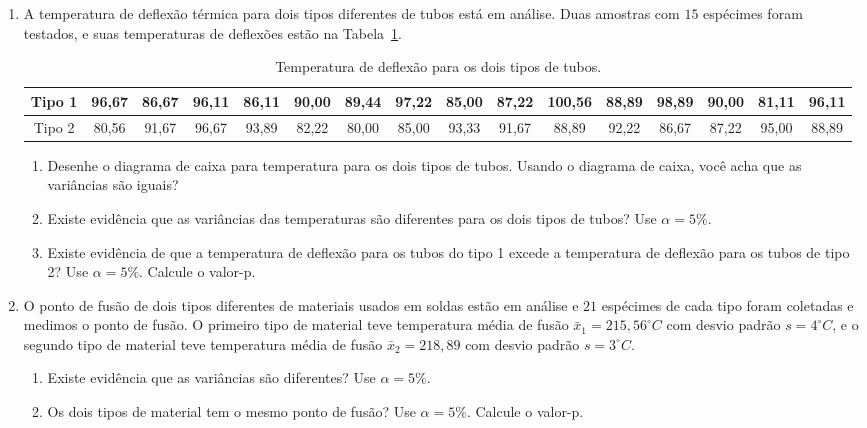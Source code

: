 \documentclass[8pt, a4paper]{article}
\begin{document}
\begin{enumerate}
	\item A temperatura de deflexão térmica para dois tipos diferentes de tubos está em análise. Duas amostras com $15$ espécimes foram testados, e suas temperaturas de deflexões estão na Tabela~\ref{tab:deflection-temp}.
	\begin{table}[ht]
		\centering
		\begin{tabular}{c|ccccccccccccccc}
			\toprule[0.05cm]
			Tipo 1 & 96,67 & 86,67 & 96,11 & 86,11 & 90,00 & 89,44 & 97,22 & 85,00 & 87,22 & 100,56 & 88,89 & 98,89 & 90,00 & 81,11 & 96,11 \\ \midrule[0.025cm]
			Tipo 2 & 80,56 & 91,67 & 96,67 & 93,89 & 82,22 & 80,00 & 85,00 & 93,33 & 91,67 & 88,89 & 92,22 & 86,67 & 87,22 & 95,00 & 88,89 \\ 
			\bottomrule[0.05cm]
		\end{tabular}
		\caption{Temperatura de deflexão para os dois tipos de tubos.} 
		\label{tab:deflection-temp}
	\end{table}
	\begin{enumerate}
		\item Desenhe o diagrama de caixa para temperatura para os dois tipos de tubos. Usando o diagrama de caixa, você acha que as variâncias são iguais?
		\item Existe evidência que as variâncias das temperaturas são diferentes para os dois tipos de tubos? Use $\alpha=5\%$.
		\item Existe evidência de que a temperatura de deflexão para os tubos do tipo 1 excede a temperatura de deflexão para os tubos de tipo 2? Use $\alpha=5\%$. Calcule o valor-p.
	\end{enumerate}

	\item O ponto de fusão de dois tipos diferentes de materiais usados em soldas estão em análise e $21$ espécimes de cada tipo foram  coletadas e medimos o ponto de fusão. O primeiro tipo de material teve temperatura média de fusão $\bar{x}_1=215,56^\circ C$ com desvio padrão $s=4^\circ C$, e o segundo tipo de material teve temperatura média de fusão $\bar{x}_2=218,89$ com desvio padrão $s=3^\circ C$. 
	\begin{enumerate}
		\item Existe evidência que as variâncias são diferentes? Use $\alpha = 5\%$.
		\item Os dois tipos de material tem o mesmo ponto de fusão? Use $\alpha = 5\%$. Calcule o valor-p.
	\end{enumerate}
	

\end{enumerate}
\end{document}
